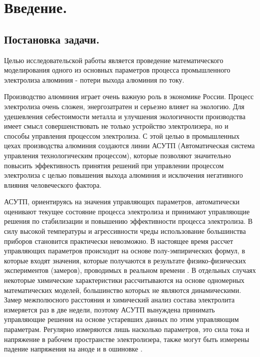 \documentclass{article}
\begin{document}


\newpage

\addto{}

\setcounter{tocdepth}{5}
\tableofcontents

\newpage

\section*{Введение.}

\subsection*{Постановка задачи.}

Целью исследовательской работы является проведение математического моделирования одного из основных параметров процесса промышленного электролиза алюминия - потери выхода алюминия по току.

Производство алюминия играет очень важную роль в экономике России. Процесс электролиза очень сложен, энергозатратен и серьезно влияет на экологию. Для удешевления себестоимости металла и улучшения экологичности производства имеет смысл совершенствовать не только устройство электролизера, но и способы управления процессом электролиза. С этой целью в промышленных цехах производства алюминия создаются линии АСУТП (Автоматическая система управления технологическим процессом), которые позволяют значительно повысить эффективность принятия решений при управлении процессом электролиза с целью повышения выхода алюминия и исключения негативного влияния человеческого фактора.

АСУТП, ориентируясь на значения управляющих параметров, автоматически оценивают текущее состояние процесса электролиза и принимают управляющие решения по стабилизации и повышению эффективности процесса электролиза. В силу высокой температуры и агрессивности чреды использование большинства приборов становится практически невозможно. В настоящее время рассчет управляющих параметров происходит на основе полу-эмпирических формул, в которые входят значения, которые получаются в результате физико-физических экспериментов (замеров), проводимых в реальном времени \cite{litlink:kalmykov}. В отдельных случаях некоторые химические характеристики рассчитываются на основе одномерных математических моделей, большинство которых не являются динамическими. Замер межполюсного расстояния и химический анализ состава электролита измеряется раз в две недели, поэтому АСУТП вынуждена принимать управляющие решения на основе устаревших данных по этим управляющим параметрам. Регулярно измеряются лишь насколько параметров, это сила тока и напряжение в рабочем пространстве электролизера, также могут быть измерены падение напряжения на аноде и в ошиновке \cite{litlink:bibliogr}.
\end{document}
